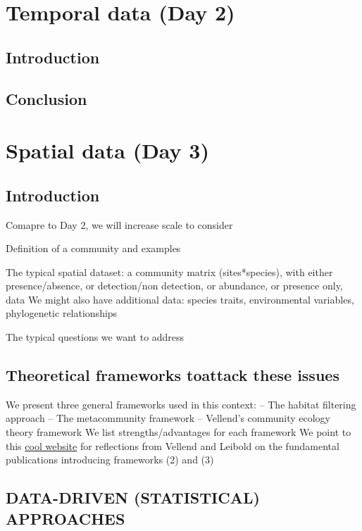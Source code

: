 \documentclass[
]{book}
\theoremstyle{definition}
\theoremstyle{definition}
\theoremstyle{definition}
\theoremstyle{definition}
\theoremstyle{remark}
\begin{document}
\chapter{Temporal data (Day 2)}\label{temporal-data-day-2}

\section{Introduction}\label{introduction}

\section{Conclusion}\label{conclusion}

\chapter{Spatial data (Day 3)}\label{spatial-data-day-3}

\section{Introduction}\label{introduction-1}

Comapre to Day 2, we will increase scale to consider

Definition of a community and examples

The typical spatial dataset: a community matrix (sites*species), with either presence/absence, or detection/non detection, or abundance, or presence only, data
We might also have additional data: species traits, environmental variables, phylogenetic relationships

The typical questions we want to address

\section{Theoretical frameworks toattack these issues}\label{theoretical-frameworks-toattack-these-issues}

We present three general frameworks used in this context:
-- The habitat filtering approach
-- The metacommunity framework
-- Vellend's community ecology theory framework
We list strengths/advantages for each framework
We point to this \href{https://reflectionsonpaperspast.wordpress.com/}{cool website} for reflections from Vellend and Leibold on the fundamental publications introducing frameworks (2) and (3)

\section{DATA-DRIVEN (STATISTICAL) APPROACHES}\label{data-driven-statistical-approaches}
\end{document}
